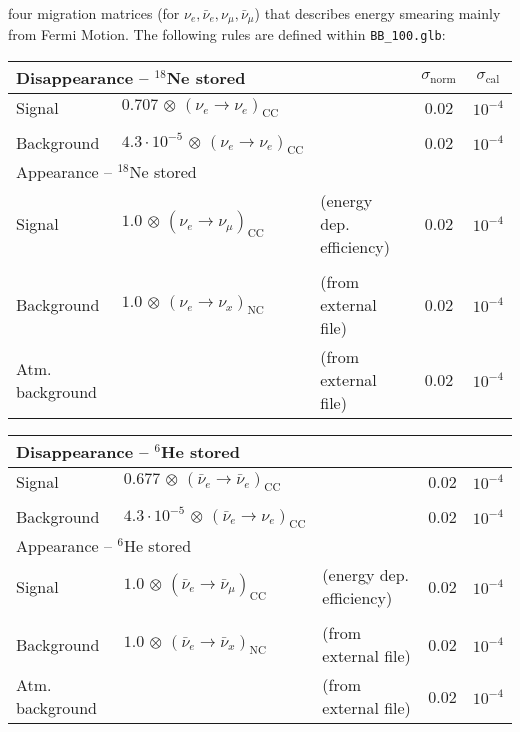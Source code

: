 \begin{appendix}
four migration matrices (for $\nu_e , \bar{\nu}_e ,\nu_{\mu} ,\bar{\nu}_\mu$) that describes energy smearing mainly
from Fermi Motion. The following rules are defined within {\tt BB\_100.glb}:
\begin{center}
\begin{tabular}{|l|ll|c|c|}
\hline \hline
\multicolumn{3}{|l|}{Disappearance -- $^{18}$Ne stored} & $\sigma_\mathrm{norm}$ & $\sigma_\mathrm{cal}$ \\ \hline
Signal & $0.707 \, \otimes \, (\nu_e\rightarrow\nu_e)_{\mathrm{CC}}$ & & 0.02 & $10^{-4}$ \\
 & & & & \\
Background & $4.3\cdot 10^{-5} \, \otimes \, (\nu_e \rightarrow \nu_e)_\mathrm{CC}$ & & 0.02 & $10^{-4}$ \\ \hline \hline 
\multicolumn{3}{|l|}{Appearance -- $^{18}$Ne stored} & & \\ \hline
Signal & $1.0 \, \otimes \, (\nu_e \rightarrow \nu_\mu)_\mathrm{CC}$ & (energy dep. efficiency) & 0.02 & $10^{-4}$ \\
 & & & & \\
Background & $1.0 \, \otimes \, (\nu_e \rightarrow \nu_x)_\mathrm{NC}$ & (from external file) & 0.02 & $10^{-4}$ \\
Atm. background & & (from external file) & 0.02 & $10^{-4}$ \\ \hline \hline
\end{tabular}
\end{center}
\begin{center}
\begin{tabular}{|l|ll|c|c|}
\hline \hline
\multicolumn{3}{|l|}{Disappearance -- $^6$He stored} & &  \\ \hline
Signal & $0.677 \, \otimes \, (\bar{\nu}_e\rightarrow\bar{\nu}_e)_{\mathrm{CC}}$ & & 0.02 & $10^{-4}$ \\
 & & & & \\
Background & $4.3\cdot 10^{-5} \, \otimes \, (\bar{\nu}_e \rightarrow \nu_e)_\mathrm{CC}$ & & 0.02 & $10^{-4}$ \\ \hline \hline 
\multicolumn{3}{|l|}{Appearance -- $^6$He stored} & & \\ \hline
Signal & $1.0 \, \otimes \, (\bar{\nu}_e \rightarrow \bar{\nu}_\mu)_\mathrm{CC}$ & (energy dep. efficiency) & 0.02 & $10^{-4}$ \\
 & & & & \\
Background & $1.0 \, \otimes \, (\bar{\nu}_e \rightarrow \bar{\nu}_x)_\mathrm{NC}$ & (from external file) & 0.02 & $10^{-4}$ \\
Atm. background & & (from external file) & 0.02 & $10^{-4}$ \\ \hline \hline
\end{tabular}
\end{center}


\end{appendix}
